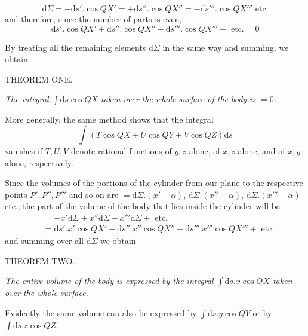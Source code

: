 \[
\mathrm{d}\Sigma=-\mathrm{d}s'.\cos QX'=+\mathrm{d}s''.\cos QX''=-\mathrm{d}s'''.\cos QX'''\text{ etc.}
\]
and therefore, since the number of parts is even,
\[
\mathrm{d}s'.\cos QX'+\mathrm{d}s''.\cos QX''+\mathrm{d}s'''.\cos QX'''+\text{ etc.}=0
\]
\par
By treating all the remaining elements $\mathrm{d}\Sigma$ in the same way and summing, we obtain
\par\medskip{}
\begin{center}THEOREM ONE.\end{center}
\par
\textit{The integral $\int\mathrm{d}s\cos QX$ taken over the whole surface of the body is $=0$.}
\par
More generally, the same method shows that the integral
\[
\int(T\cos QX+U\cos QY+V\cos QZ)\mathrm{d}s
\]
vanishes if $T,U,V$ denote rational functions of $y,z$ alone, of $x,z$ alone, and of $x,y$ alone, respectively.

\par
Since the volumes of the portions of the cylinder from our plane to the respective points $P',P'',P'''$ and so on are $=\mathrm{d}\Sigma.(x'-\alpha)$, $\mathrm{d}\Sigma.(x''-\alpha)$, $\mathrm{d}\Sigma.(x'''-\alpha)$ etc., the part of the volume of the body that lies inside the cylinder will be
\[
\begin{aligned}
&=-x'\mathrm{d}\Sigma+x''\mathrm{d}\Sigma-x'''\mathrm{d}\Sigma+\text{ etc.}\\
&=\mathrm{d}s'.x'\cos QX'+\mathrm{d}s''.x''\cos QX''+\mathrm{d}s'''.x'''\cos QX'''+\text{ etc.}
\end{aligned}
\]
and summing over all $\mathrm{d}\Sigma$ we obtain
\par\medskip{}
\begin{center}THEOREM TWO.\end{center}
\par
\textit{The entire volume of the body is expressed by the integral $\int\mathrm{d}s.x\cos QX$ taken over the whole surface.}
\par
Evidently the same volume can also be expressed by $\int\mathrm{d}s.y\cos QY$ or by $\int\mathrm{d}s.z\cos QZ$.

